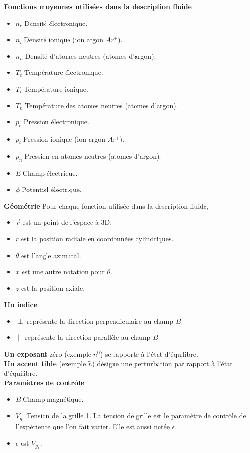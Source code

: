\documentclass{book}
\begin{document}
{\bf Fonctions moyennes utilis\'ees dans la description fluide}
\begin{itemize}
\item $n_e$ Densit\'e \'electronique.
\item $n_i$ Densit\'e ionique (ion argon $Ar^+$).
\item $n_n$ Densit\'e d'atomes neutres (atomes d'argon).
\item $T_e$ Temp\'erature \'electronique.
\item $T_i$ Temp\'erature ionique.
\item $T_n$ Temp\'erature des atomes neutres (atomes d'argon).
\item $p_e$ Pression \'electronique.
\item $p_i$ Pression ionique (ion argon $Ar^+$).
\item $p_n$ Pression en atomes neutres (atomes d'argon).
\item $E$ Champ \'electrique.
\item $\phi$ Potentiel  \'electrique.
\end{itemize}

{\bf G\'eom\'etrie}
Pour chaque fonction utilis\'ee dans la description fluide, 
\begin{itemize}
\item $\vec{r}$ est un point de l'espace \`a 3D.
\item $r$ est la position radiale en coordonn\'ees cylindriques.
\item $\theta$ est l'angle azimutal.
\item $x$ est une autre notation pour $\theta$.
\item $z$ est la position axiale.
\end{itemize}

{\bf Un indice}
\begin{itemize}
\item $\perp$ repr\'esente la direction perpendiculaire au champ $B$.
\item $\parallel$ repr\'esente la direction parall\`ele au champ $B$.
\end{itemize}
{\bf Un exposant} z\'ero (exemple $n^0$) se rapporte \`a l'\'etat
d'\'equilibre.\\ 
{\bf Un accent tilde} (exemple $\tilde n$) d\'esigne une perturbation par
rapport \`a l'\'etat d'\'equilibre.\\ 


{\bf Param\`etres de contr\^ole}
\begin{itemize}
\item $B$ Champ magn\'etique.
\item $V_{g_1}$ Tension de la grille 1. La tension de grille est le
param\`etre de contr\^ole de l'exp\'erience que l'on fait varier. Elle
est aussi not\'ee $\epsilon$.
\item $\epsilon$ est $V_{g_1}$.
\end{itemize}
\end{document}
